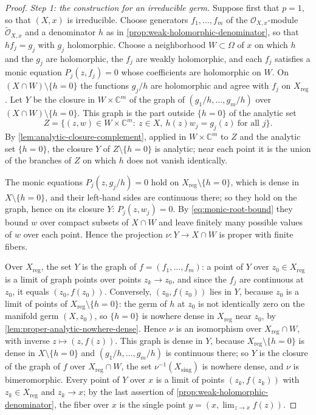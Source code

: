 \begin{proof}
\emph{Step 1: the construction for an irreducible germ.} Suppose first that $p=1$, so that $(X,x)$ is irreducible. Choose generators $f_1,\ldots,f_m$ of the $\mathcal O_{X,x}$-module $\widetilde{\mathcal O}_{X,x}$ and a denominator $h$ as in \cref{prop:weak-holomorphic-denominator}, so that $hf_j=g_j$ with $g_j$ holomorphic. Choose a neighborhood $W\subset\Omega$ of $x$ on which $h$ and the $g_j$ are holomorphic, the $f_j$ are weakly holomorphic, and each $f_j$ satisfies a monic equation $P_j(z,f_j)=0$ whose coefficients are holomorphic on $W$. On $(X\cap W)\setminus\{h=0\}$ the functions $g_j/h$ are holomorphic and agree with $f_j$ on $X_{\mathrm{reg}}$. Let $Y$ be the closure in $W\times\mathbb C^m$ of the graph of $(g_1/h,\ldots,g_m/h)$ over $(X\cap W)\setminus\{h=0\}$. This graph is the part outside $\{h=0\}$ of the analytic set
\[
 Z=\{(z,w)\in W\times\mathbb C^m:\ z\in X,\ h(z)w_j=g_j(z)\ \text{for all }j\}.
\]
By \cref{lem:analytic-closure-complement}, applied in $W\times\mathbb C^m$ to $Z$ and the analytic set $\{h=0\}$, the closure $Y$ of $Z\setminus\{h=0\}$ is analytic; near each point it is the union of the branches of $Z$ on which $h$ does not vanish identically.

The monic equations $P_j(z,g_j/h)=0$ hold on $X_{\mathrm{reg}}\setminus\{h=0\}$, which is dense in $X\setminus\{h=0\}$, and their left-hand sides are continuous there; so they hold on the graph, hence on its closure $Y$: $P_j(z,w_j)=0$. By \eqref{eq:monic-root-bound} they bound $w$ over compact subsets of $X\cap W$ and leave finitely many possible values of $w$ over each point. Hence the projection $\nu\colon Y\to X\cap W$ is proper with finite fibers.

Over $X_{\mathrm{reg}}$, the set $Y$ is the graph of $f=(f_1,\ldots,f_m)$: a point of $Y$ over $z_0\in X_{\mathrm{reg}}$ is a limit of graph points over points $z_k\to z_0$, and since the $f_j$ are continuous at $z_0$, it equals $(z_0,f(z_0))$. Conversely, $(z_0,f(z_0))$ lies in $Y$, because $z_0$ is a limit of points of $X_{\mathrm{reg}}\setminus\{h=0\}$: the germ of $h$ at $z_0$ is not identically zero on the manifold germ $(X,z_0)$, so $\{h=0\}$ is nowhere dense in $X_{\mathrm{reg}}$ near $z_0$, by \cref{lem:proper-analytic-nowhere-dense}. Hence $\nu$ is an isomorphism over $X_{\mathrm{reg}}\cap W$, with inverse $z\mapsto(z,f(z))$. This graph is dense in $Y$, because $X_{\mathrm{reg}}\setminus\{h=0\}$ is dense in $X\setminus\{h=0\}$ and $(g_1/h,\ldots,g_m/h)$ is continuous there; so $Y$ is the closure of the graph of $f$ over $X_{\mathrm{reg}}\cap W$, the set $\nu^{-1}(X_{\mathrm{sing}})$ is nowhere dense, and $\nu$ is bimeromorphic. Every point of $Y$ over $x$ is a limit of points $(z_k,f(z_k))$ with $z_k\in X_{\mathrm{reg}}$ and $z_k\to x$; by the last assertion of \cref{prop:weak-holomorphic-denominator}, the fiber over $x$ is the single point $y=(x,\lim_{z\to x}f(z))$.


\end{proof}
